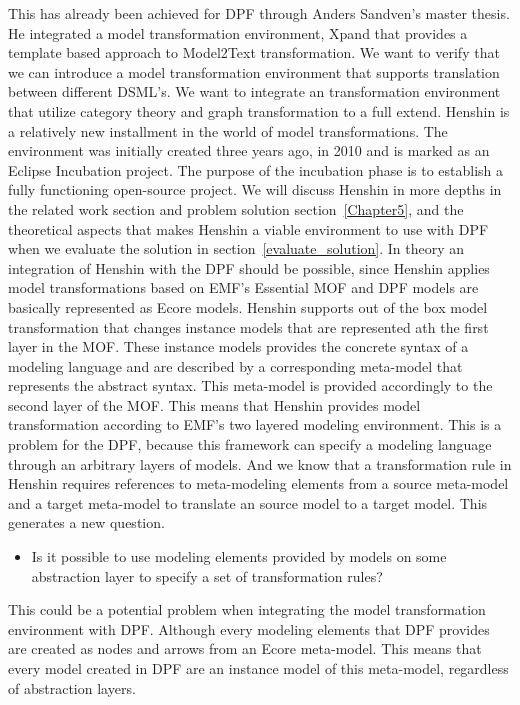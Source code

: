 This has already been achieved for DPF through Anders
Sandven\cite{Sandven_thesis}'s master thesis. He integrated a model
transformation environment, Xpand\cite{Xpand} that provides a template based
approach to Model2Text transformation. We want to verify that we can
introduce a model transformation environment that supports translation between
different DSML's. We want to integrate an transformation environment that
utilize category theory and graph transformation to a full extend.
Henshin\cite{Henshin_2010,Henshin} is a relatively new installment in the world
of model transformations. The environment was initially created three years ago,
in 2010 and is marked as an Eclipse Incubation project. The purpose of the
incubation phase is to establish a fully functioning open-source project. We
will discuss Henshin in more depths in the related work section and problem
solution section~\ref{Chapter5}, and the theoretical aspects that makes Henshin
a viable environment to use with DPF when we evaluate the solution in
section~\ref{evaluate_solution}. In theory an integration of Henshin with the
DPF should be possible, since Henshin applies model transformations based on
EMF's Essential MOF and DPF models are basically represented as Ecore models.
Henshin supports out of the box model transformation that changes instance
models that are represented ath the first layer in the MOF. These instance
models provides the concrete syntax of a modeling language and are described by
a corresponding meta-model that represents the abstract syntax. This meta-model
is provided accordingly to the second layer of the MOF. This means that Henshin
provides model transformation according to EMF's two layered modeling
environment. This is a problem for the DPF, because this framework can specify a
modeling language through an arbitrary layers of models. And we know that a
transformation rule in Henshin requires references to meta-modeling elements
from a source meta-model and a target meta-model to translate an source model to
a target model. This generates a new question. 

\begin{itemize}  

  \item Is it possible to use modeling elements provided by models on some
  abstraction layer to specify a set of transformation rules?

\end{itemize}

This could be a potential problem when integrating the model transformation
environment with DPF. Although every modeling elements that DPF provides are
created as nodes and arrows from an Ecore meta-model. This means that every
model created in DPF are an instance model of this meta-model, regardless of
abstraction layers. 



